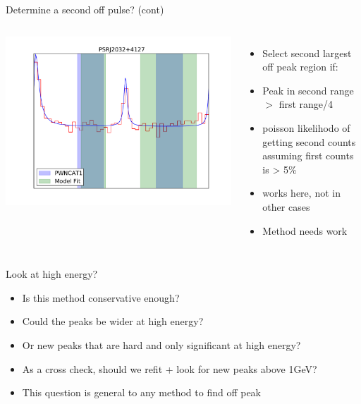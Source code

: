 \documentclass[12pt]{beamer}
\begin{document}
\begin{frame}{Determine a second off pulse? (cont)}
  \begin{columns}
    \includegraphics[width=1\textwidth]{plots/second_off_pulse_b.pdf}
    \begin{itemize}
      \item Select second largest off peak region if:
      \item Peak in second range $>$ first range/4
      \item poisson likelihodo of getting second counts assuming first counts is > 5\%
      \item works here, not in other cases
      \item Method needs work
    \end{itemize}
  \end{columns}
\end{frame}



\begin{frame}{Look at high energy?}
  \begin{itemize}
    \item Is this method conservative enough?
    \item Could the peaks be wider at high energy?
    \item Or new peaks that are hard and only significant at high energy?
    \item As a cross check, should we refit + look for new peaks above 1GeV?
    \item This question is general to any method to find off peak
  \end{itemize}
\end{frame}
\end{document}
